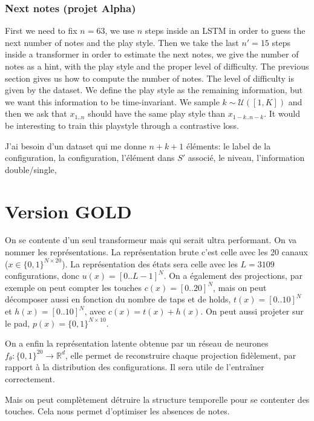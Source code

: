 \documentclass[11pt]{article}
\newcommand{\R}{\mathbb{R}}
\begin{document}
\subsubsection{Next notes (projet Alpha)}
First we need to fix $n = 63$, we use $n$ steps inside an LSTM in order to guess the next number of notes and the play style. Then we take the last $n' = 15$ steps inside a transformer in order to estimate the next notes, we give the number of notes as a hint, with the play style and the proper level of difficulty. The previous section gives us how to compute the number of notes. The level of difficulty is given by the dataset. 
We define the play style as the remaining information, but we want this information to be time-invariant. We sample $k \sim \mathcal{U}([1, K])$ and then we ask that $x_{1..n}$ should have the same play style than $x_{1-k..n-k}$. It would be interesting to train this playstyle through a contrastive loss. 

J'ai besoin d'un dataset qui me donne $n+k+1$ éléments: le label de la configuration, la configuration, l'élément dans $S'$ associé, le niveau, l'information double/single, 

\newpage
\section{Version GOLD}
On se contente d'un seul transformeur mais qui serait ultra performant. 
On va nommer les représentations. La représentation brute c'est celle avec les 20 canaux ($x \in \{0,1\}^{N \times 20}$). La représentation des états sera celle avec les $L = 3109$ configurations, donc $u(x) = [0..L-1]^N$. 
On a également des projections, par exemple on peut compter les touches $c(x) = [0..20]^N$, mais on peut décomposer aussi en fonction du nombre de taps et de holds, $t(x) = [0..10]^N$ et $h(x) = [0..10]^N$, avec $c(x) = t(x) + h(x)$. On peut aussi projeter sur le pad, $p(x) = \{0, 1\}^{N \times 10}$. 

On a enfin la représentation latente obtenue par un réseau de neurones $f_\theta : \{0,1\}^{20} \rightarrow \R^d$, elle permet de reconstruire chaque projection fidèlement, par rapport à la distribution des configurations. Il sera utile de l'entraîner correctement. 

Mais on peut complètement détruire la structure temporelle pour se contenter des touches. Cela nous permet d'optimiser les absences de notes. 



	
\end{document}
